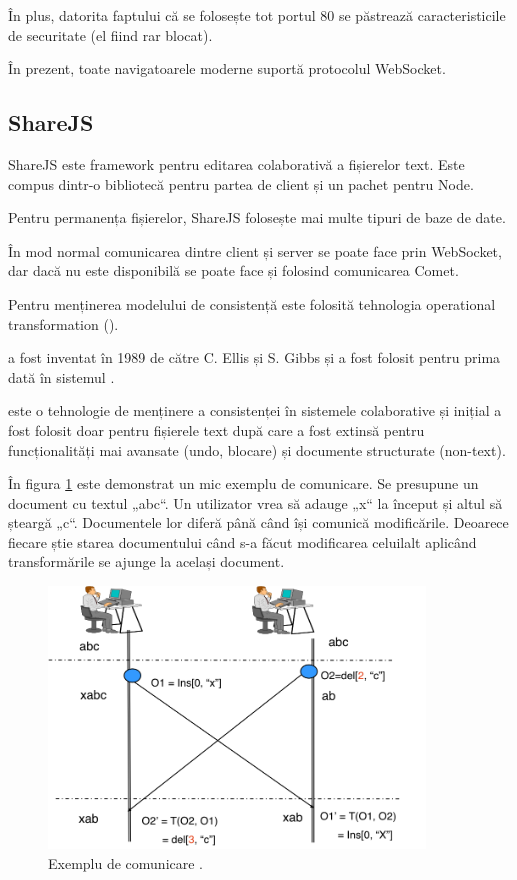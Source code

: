 \documentclass[a4wide,12pt]{report}
\newcommand{\eng}[1]{{#1}} %
\newcommand{\acr}[1]{{\textsmaller[1]{\textsc{#1}}}} %
\begin{document}
În plus, datorita faptului că se folosește tot portul 80 se păstrează
caracteristicile de securitate (el fiind rar blocat).

În prezent, toate navigatoarele moderne suportă protocolul WebSocket.

\subsection{ShareJS}
\label{sharejssub}

ShareJS este \eng{framework} pentru editarea colaborativă a fișierelor text.
Este compus dintr-o bibliotecă pentru partea de client și un pachet pentru Node.

Pentru permanența fișierelor, ShareJS folosește mai multe tipuri de baze de
date.

În mod normal comunicarea dintre client și server se poate face prin WebSocket,
dar dacă nu este disponibilă se poate face și folosind comunicarea Comet.

Pentru menținerea modelului de consistență este folosită tehnologia operational
transformation (\acr{OT}).

\acr{OT} a fost inventat în 1989 de către C. Ellis și S. Gibbs și a fost folosit
pentru prima dată în sistemul \acr{GROVE}\cite{concont}.

\acr{OT} este o tehnologie de menținere a consistenței în sistemele colaborative
și inițial a fost folosit doar pentru fișierele text după care a fost extinsă
pentru funcționalități mai avansate (\eng{undo}, blocare) și documente
structurate (non-text).

În figura \ref{otfig} este demonstrat un mic exemplu de comunicare. Se presupune
un document cu textul „abc“. Un utilizator vrea să adauge „x“ la început și
altul să șteargă „c“. Documentele lor diferă până când își comunică modificările.
Deoarece fiecare știe starea documentului când s-a făcut modificarea celuilalt
aplicând transformările se ajunge la același document.

\begin{figure}
\begin{center}
\includegraphics[width=10cm]{imagini/ot}
\end{center}
\caption{Exemplu de comunicare \acr{OT}.\cite{otimage}}
\label{otfig}
\end{figure}
\end{document}
